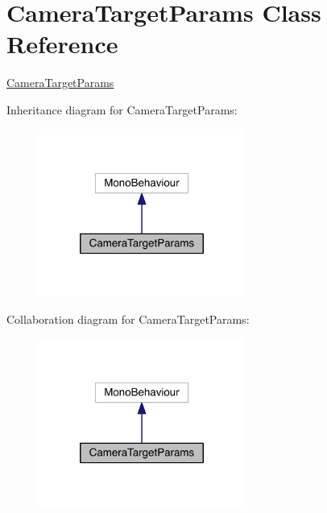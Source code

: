 \hypertarget{class_camera_target_params}{}\section{Camera\+Target\+Params Class Reference}
\label{class_camera_target_params}


\hyperlink{class_camera_target_params}{Camera\+Target\+Params}  




Inheritance diagram for Camera\+Target\+Params\+:\nopagebreak
\begin{figure}[H]
\begin{center}
\leavevmode
\includegraphics[width=192pt]{class_camera_target_params__inherit__graph}
\end{center}
\end{figure}


Collaboration diagram for Camera\+Target\+Params\+:\nopagebreak
\begin{figure}[H]
\begin{center}
\leavevmode
\includegraphics[width=192pt]{class_camera_target_params__coll__graph}
\end{center}
\end{figure}
